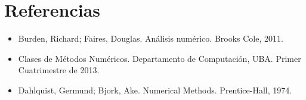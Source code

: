 \section{Referencias}

\begin{itemize}
  \item \nocite {Burden} Burden, Richard; Faires, Douglas. An\'alisis num\'erico. Brooks Cole, 2011.
  \item \nocite {MN} Clases de M\'etodos Num\'ericos. Departamento de Computaci\'on, UBA. Primer Cuatrimestre de 2013.
  \item \nocite {Dahlquist} Dahlquist, Germund; Bjork, Ake. Numerical Methods. Prentice-Hall, 1974.
\end{itemize}
